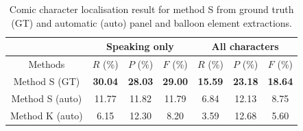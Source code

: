 

\begin{table}[ht]
  \centering
  \caption{Comic character localisation result for method S from ground truth (GT) and automatic (auto) panel and balloon element extractions.}
  \begin{tabular}{|c|c|c|c|c|c|c|}
  \hline
    & \multicolumn{3}{|c|}{Speaking only}  & \multicolumn{3}{|c|}{All characters}   \\
  \hline
  Methods  &  $ R$ (\%)  & $P$ (\%)& $F$ (\%)   &  $R$ (\%)  & $P$ (\%)   & $F$ (\%)\\
  \hline
  Method S (GT)  & \textbf{30.04} & \textbf{28.03} & \textbf{29.00} &  \textbf{15.59}    &  \textbf{23.18}   &  \textbf{18.64}   \\
  \hline
  Method S (auto)     & 11.77  & 11.82 & 11.79 & 6.84    &   12.13     &   8.75  \\
  \hline
  Method K (auto)     & 6.15  & 12.30 & 8.20 &  3.59  & 12.68 & 5.60 \\
  \hline
  \end{tabular}
      \label{tab:ex:character_localisation_result_summary}
\end{table}%


